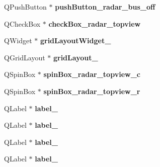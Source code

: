 \begin{DoxyCompactItemize}
\item 
\hypertarget{class_ui___main_window_ada00708af0ef7d93c2dd8e480ae2bdfc}{}Q\+Push\+Button $\ast$ {\bfseries push\+Button\+\_\+radar\+\_\+bus\+\_\+off}\label{class_ui___main_window_ada00708af0ef7d93c2dd8e480ae2bdfc}

\item 
\hypertarget{class_ui___main_window_aecb176939acf82378803b4ce8e8e07b6}{}Q\+Check\+Box $\ast$ {\bfseries check\+Box\+\_\+radar\+\_\+topview}\label{class_ui___main_window_aecb176939acf82378803b4ce8e8e07b6}

\item 
\hypertarget{class_ui___main_window_ae092907e20623373b790789a01756d3d}{}Q\+Widget $\ast$ {\bfseries grid\+Layout\+Widget\+\_}\label{class_ui___main_window_ae092907e20623373b790789a01756d3d}

\item 
\hypertarget{class_ui___main_window_a1482572d55e80324ebb4a9e53c0120e3}{}Q\+Grid\+Layout $\ast$ {\bfseries grid\+Layout\+\_}\label{class_ui___main_window_a1482572d55e80324ebb4a9e53c0120e3}

\item 
\hypertarget{class_ui___main_window_a6f531d3f4695065311f1be6faecefac7}{}Q\+Spin\+Box $\ast$ {\bfseries spin\+Box\+\_\+radar\+\_\+topview\+\_\+c}\label{class_ui___main_window_a6f531d3f4695065311f1be6faecefac7}

\item 
\hypertarget{class_ui___main_window_a42f43a5485d4938125a9feb5a3a8d4af}{}Q\+Spin\+Box $\ast$ {\bfseries spin\+Box\+\_\+radar\+\_\+topview\+\_\+r}\label{class_ui___main_window_a42f43a5485d4938125a9feb5a3a8d4af}

\item 
\hypertarget{class_ui___main_window_aa0d07c96f36b94e35e584256ee6b6d9e}{}Q\+Label $\ast$ {\bfseries label\+\_}\label{class_ui___main_window_aa0d07c96f36b94e35e584256ee6b6d9e}

\item 
\hypertarget{class_ui___main_window_a92ada1ca7f65b72ecf4cba1198c44380}{}Q\+Label $\ast$ {\bfseries label\+\_}\label{class_ui___main_window_a92ada1ca7f65b72ecf4cba1198c44380}

\item 
\hypertarget{class_ui___main_window_ad8951142a7b5408cf5f0f3b10c79a1a4}{}Q\+Label $\ast$ {\bfseries label\+\_}\label{class_ui___main_window_ad8951142a7b5408cf5f0f3b10c79a1a4}

\item 
\hypertarget{class_ui___main_window_a40eea22fe5c81f370b7464d2e962fe8d}{}Q\+Label $\ast$ {\bfseries label\+\_}\label{class_ui___main_window_a40eea22fe5c81f370b7464d2e962fe8d}


\end{DoxyCompactItemize}

